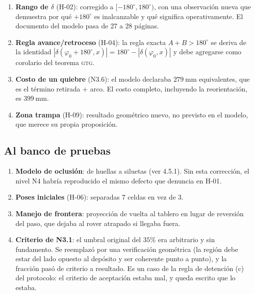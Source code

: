 \documentclass[11pt,a4paper]{article}
\newcommand{\grados}{^{\circ}}
\begin{document}
\begin{enumerate}[label=\arabic*.,leftmargin=2.4em,itemsep=3pt]
\item \textbf{Rango de $\delta$} (H-02): corregido a $[-180\grados,180\grados)$, con una
      observación nueva que demuestra por qué $+180\grados$ es inalcanzable y qué
      significa operativamente. El documento del modelo pasa de 27 a 28 páginas.
\item \textbf{Regla avance/retroceso} (H-04): la regla exacta $A+B>180\grados$ se deriva
      de la identidad $|\delta(\varphi_0+180\grados,x)| = 180\grados-|\delta(\varphi_0,x)|$
      y debe agregarse como corolario del teorema \textsc{gtg}.
\item \textbf{Costo de un quiebre} (N3.6): el modelo declaraba $279\ \mathrm{mm}$
      equivalentes, que es el término retirada $+$ arco. El costo completo, incluyendo la
      reorientación, es $399\ \mathrm{mm}$.
\item \textbf{Zona trampa} (H-09): resultado geométrico nuevo, no previsto en el modelo,
      que merece su propia proposición.
\end{enumerate}

\subsection{Al banco de pruebas}

\begin{enumerate}[label=\arabic*.,leftmargin=2.4em,itemsep=3pt]
\item \textbf{Modelo de oclusión}: de huellas a siluetas (ver 4.5.1). Sin esta
      corrección, el nivel N4 habría reproducido el mismo defecto que denuncia en H-01.
\item \textbf{Poses iniciales} (H-06): separadas $7$ celdas en vez de $3$.
\item \textbf{Manejo de frontera}: proyección de vuelta al tablero en lugar de reversión
      del paso, que dejaba al rover atrapado si llegaba fuera.
\item \textbf{Criterio de N3.1}: el umbral original del $35\%$ era arbitrario y sin
      fundamento. Se reemplazó por una verificación geométrica (la región debe estar del
      lado opuesto al depósito y ser coherente punto a punto), y la fracción pasó de
      criterio a resultado. Es un caso de la regla de detención (c) del protocolo: el
      criterio de aceptación estaba mal, y queda escrito que lo estaba.
\end{enumerate}
\end{document}
